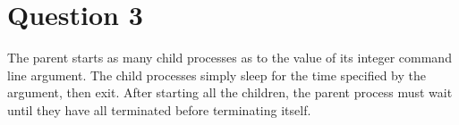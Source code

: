 \documentclass[main.tex]{subfiles}
\begin{document}
\section{Question 3}

The parent starts as many child processes as to the value of its integer command
line argument. The child processes simply sleep for the time specified by the
argument, then exit. After starting all the children, the parent process must
wait until they have all terminated before terminating itself.



\end{document}
